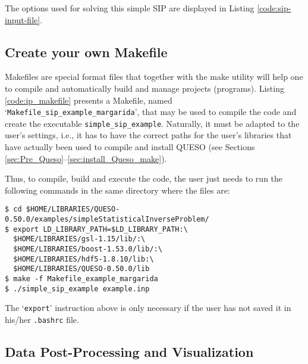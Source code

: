 The options used for solving this simple SIP are displayed in Listing \ref{code:sip-input-file}.





\subsection{Create your own Makefile}\label{sec:sip-makefile}

Makefiles are special format files that together with the make utility will help one to compile and automatically build and manage projects (programs).  
Listing \ref{code:ip_makefile} presents a Makefile, named `\texttt{Makefile\_sip\_example\_margarida}', that may be used to compile the code and create the executable \verb+simple_sip_example+. Naturally, it must be adapted to the user's settings, i.e., it has to have the correct paths for the user's libraries that have actually been used to compile and install QUESO  (see Sections \ref{sec:Pre_Queso}--\ref{sec:install_Queso_make}).



Thus, to compile, build and execute the code, the user just needs to run the following commands in the same directory where the files are:
\begin{lstlisting}
$ cd $HOME/LIBRARIES/QUESO-0.50.0/examples/simpleStatisticalInverseProblem/
$ export LD_LIBRARY_PATH=$LD_LIBRARY_PATH:\
  $HOME/LIBRARIES/gsl-1.15/lib/:\
  $HOME/LIBRARIES/boost-1.53.0/lib/:\
  $HOME/LIBRARIES/hdf5-1.8.10/lib:\
  $HOME/LIBRARIES/QUESO-0.50.0/lib 
$ make -f Makefile_example_margarida 
$ ./simple_sip_example example.inp
\end{lstlisting}

The `\verb+export+' instruction above is only necessary if the user has not saved it in his/her \verb+.bashrc+ file. 


\subsection{Data Post-Processing and Visualization}\label{sec:sip-results}


